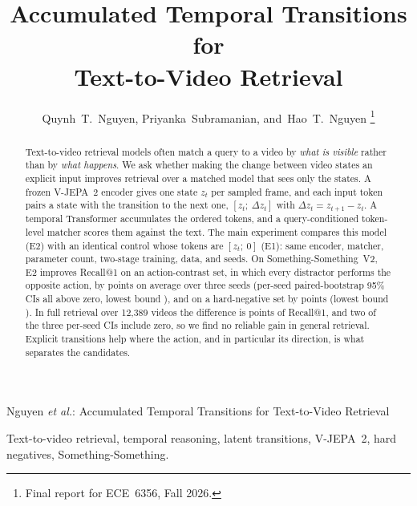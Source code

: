 \documentclass[lettersize,journal]{IEEEtran}
\begin{document}
\title{Accumulated Temporal Transitions for\\ Text-to-Video Retrieval}

\author{Quynh~T.~Nguyen, Priyanka~Subramanian, and~Hao~T.~Nguyen%
\thanks{Final report for ECE~6356, Fall 2026.}}

%
{Nguyen \MakeLowercase{\textit{et al.}}: Accumulated Temporal Transitions for Text-to-Video Retrieval}

\maketitle

\begin{abstract}
Text-to-video retrieval models often match a query to a video by \emph{what is
visible} rather than by \emph{what happens}. We ask whether making the change
between video states an explicit input improves retrieval over a matched model
that sees only the states. A frozen V-JEPA~2 encoder gives one state $z_t$ per
sampled frame, and each input token pairs a state with the transition to the
next one, $[z_t;\ \Delta z_t]$ with $\Delta z_t = z_{t+1}-z_t$. A temporal
Transformer accumulates the ordered tokens, and a query-conditioned token-level
matcher scores them against the text. The main experiment compares this model
(E2) with an identical control whose tokens are $[z_t;\ 0]$ (E1): same encoder,
matcher, parameter count, two-stage training, data, and seeds. On
Something-Something~V2, E2 improves Recall@1 on an action-contrast set, in
which every distractor performs the opposite action, by
\DeltaAcRone{} points on average over three seeds (per-seed paired-bootstrap
95\% CIs all above zero, lowest bound \DeltaAcRoneLowMin), and on a
hard-negative set by \DeltaHnRone{} points (lowest bound \DeltaHnRoneLowMin).
In full retrieval over 12{,}389 videos the difference is \DeltaFullRone{}
points of Recall@1, and two of the three per-seed CIs include zero, so we find
no reliable gain in general retrieval. Explicit transitions help
where the action, and in particular its direction, is what separates the
candidates.
\end{abstract}

\begin{IEEEkeywords}
Text-to-video retrieval, temporal reasoning, latent transitions, V-JEPA~2,
hard negatives, Something-Something.
\end{IEEEkeywords}

\end{document}
